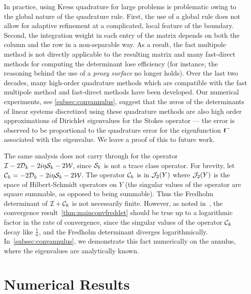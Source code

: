 \begin{remark}
In practice, using Kress quadrature for large
problems is problematic owing to the global
nature of the quadrature rule.
%
First, the use of a global rule does not allow
for adaptive refinement at a complicated, local
feature of the boundary.
%
Second, the integration weight in each entry
of the matrix depends on both the column and the row
in a non-separable way.
%
As a result, the fast multipole method is not
directly applicable to the resulting matrix
and many fast-direct methods for computing
the determinant lose efficiency (for
instance, the reasoning behind the use of a
{\em proxy surface} \cite{cheng2005compression}
no longer holds).
Over the last two decades, many high-order quadrature
methods which are compatible with
the fast multipole method and fast-direct methods
have been developed.
%
Our numerical experiments, see \cref{subsec:convannulus},
suggest that the zeros of the 
determinants of linear systems discretized using 
these quadrature methods are also high order approximations
of Dirichlet eigenvalues for the Stokes operator ---
the error is observed to be proportional to the quadrature error
for the eigenfunction ${\boldsymbol t}^{-}$ associated with the eigenvalue.
We leave a proof of this to future work.
\end{remark}

\begin{remark}
The same analysis does not carry through for the operator
$\mathcal I - 2 {\mathcal D}_{k} - 2i\eta {\mathcal S}_{k} - 2{\mathcal W}$, 
since ${\mathcal S}_{k}$ is not a trace class operator.
For brevity, let $\mathcal C_{k} = -2{\mathcal D}_{k} - 2i\eta {\mathcal S}_{k} - 2{\mathcal W}$.
The operator $\mathcal C_{k}$ is 
in ${\mathcal J}_{2}(Y)$ where
${\mathcal J}_{2}(Y)$ is the space of Hilbert-Schmidt operators
on $Y$ (the singular values of the operator are square
summable, as opposed to being summable).
Thus the Fredholm determinant of $\mathcal I + \mathcal C_{k}$
is not necessarily finite. 
However, as noted in~\cite{zhao2015robust}, the convergence
result~\cref{thm:mainconvfreddet}
should be true up to a logarithmic factor in the rate
of convergence, since the singular values of the operator
$\mathcal C_{k}$ decay like $\frac{1}{n}$, and the
Fredholm determinant diverges logarithmically. 
In~\cref{subsec:convannulus}, we demonstrate this fact
numerically on the annulus, where the eigenvalues are
analytically known. 
\end{remark}


%
\section{Numerical Results}
\label{sec:numerical}

